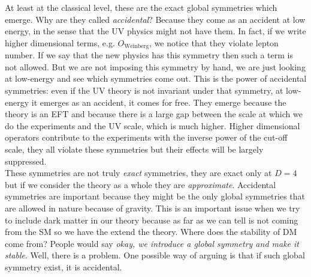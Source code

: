 \documentclass[../main.tex]{subfiles}
\begin{document}
At least at the classical level, these are the exact global symmetries which emerge. Why are they called \textit{accidental}? Because they come as an accident at low energy, in the sense that the UV physics might not have them. In fact, if we write higher dimensional terms, e.g. $O_{\text{Weinberg}}$, we notice that they violate lepton number. If we say that the new physics has this symmetry then such a term is not allowed. But we are not imposing this symmetry by hand, we are just looking at low-energy and see which symmetries come out. This is the power of accidental symmetries: even if the UV theory is not invariant under that symmetry, at low-energy it emerges as an accident, it comes for free. They emerge because the theory is an EFT and because there is a large gap between the scale at which we do the experiments and the UV scale, which is much higher. Higher dimensional operators contribute to the experiments with the inverse power of the cut-off scale, they all violate these symmetries but their effects will be largely suppressed.\\
These symmetries are not truly \textit{exact} symmetries, they are exact only at $D=4$ but if we consider the theory as a whole they are \textit{approximate}. Accidental symmetries are important because they might be the only global symmetries that are allowed in nature because of gravity. This is an important issue when we try to include dark matter in our theory because as far as we can tell is not coming from the SM so we have the extend the theory. Where does the stability of DM come from? People would say \textit{okay, we introduce a global symmetry and make it stable}. Well, there is a problem. One possible way of arguing is that if such global symmetry exist, it is accidental.
\end{document}
